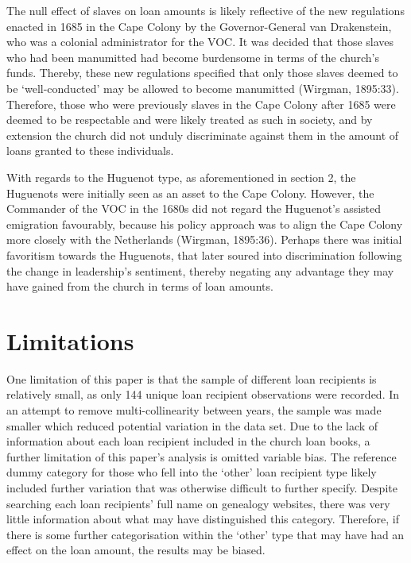 \documentclass[11pt,preprint, authoryear]{elsarticle}
\numberwithin{equation}{section}
\numberwithin{figure}{section}
\numberwithin{table}{section}
\begin{document}
The null effect of slaves on loan amounts is likely reflective of the
new regulations enacted in 1685 in the Cape Colony by the
Governor-General van Drakenstein, who was a colonial administrator for
the VOC. It was decided that those slaves who had been manumitted had
become burdensome in terms of the church's funds. Thereby, these new
regulations specified that only those slaves deemed to be
`well-conducted' may be allowed to become manumitted (Wirgman, 1895:33).
Therefore, those who were previously slaves in the Cape Colony after
1685 were deemed to be respectable and were likely treated as such in
society, and by extension the church did not unduly discriminate against
them in the amount of loans granted to these individuals.

With regards to the Huguenot type, as aforementioned in section 2, the
Huguenots were initially seen as an asset to the Cape Colony. However,
the Commander of the VOC in the 1680s did not regard the Huguenot's
assisted emigration favourably, because his policy approach was to align
the Cape Colony more closely with the Netherlands (Wirgman, 1895:36).
Perhaps there was initial favoritism towards the Huguenots, that later
soured into discrimination following the change in leadership's
sentiment, thereby negating any advantage they may have gained from the
church in terms of loan amounts.

\hypertarget{limitations}{%
\section{\texorpdfstring{Limitations
\label{Limitations}}{Limitations }}\label{limitations}}

One limitation of this paper is that the sample of different loan
recipients is relatively small, as only 144 unique loan recipient
observations were recorded. In an attempt to remove multi-collinearity
between years, the sample was made smaller which reduced potential
variation in the data set. Due to the lack of information about each
loan recipient included in the church loan books, a further limitation
of this paper's analysis is omitted variable bias. The reference dummy
category for those who fell into the `other' loan recipient type likely
included further variation that was otherwise difficult to further
specify. Despite searching each loan recipients' full name on genealogy
websites, there was very little information about what may have
distinguished this category. Therefore, if there is some further
categorisation within the `other' type that may have had an effect on
the loan amount, the results may be biased.
\end{document}
